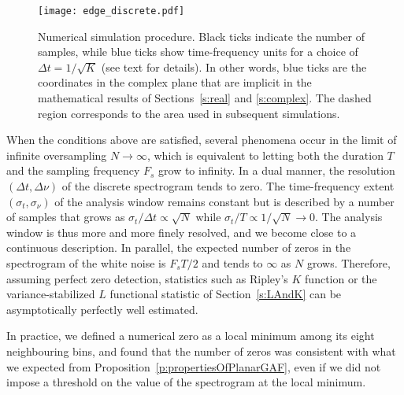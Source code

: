 \begin{figure}
	\centering 
	\texttt{[image: edge\_discrete.pdf]}
\caption{Numerical
    simulation procedure. Black ticks indicate the number of samples, while blue
    ticks show time-frequency units for a choice of $\Delta t = 1/\sqrt{K}$ (see
    text for details). In other words, blue ticks are the coordinates in the
    complex plane that are implicit in the mathematical results of
    Sections~\ref{s:real} and \ref{s:complex}. The dashed region corresponds to the area used in subsequent simulations.}\label{fig:edge_effects}
\end{figure}

When the conditions above are satisfied, several phenomena occur in the limit of
infinite oversampling $N\to\infty$, which is equivalent to letting both the
duration $T$ and the sampling
frequency $F_s$ grow to infinity. In a dual manner, the resolution $(\Delta t, \Delta \nu)$ of the
discrete spectrogram tends to zero. The time-frequency extent $(\sigma_t, \sigma_\nu)$ of
the analysis window remains constant but is described by a number of samples that grows as $\sigma_t/\Delta t \propto\sqrt{N}$ while $\sigma_t/T\propto 1/\sqrt{N}\to 0$. The analysis window is thus more and more finely resolved, and
we become close to a continuous description.
In parallel, the expected number of zeros in the spectrogram of the white noise is $F_sT/2$ and
tends to $\infty$ as $N$ grows. Therefore, assuming perfect zero detection, statistics such as Ripley's $K$ function
or the variance-stabilized $L$ functional statistic of Section~\ref{s:LAndK} can
be asymptotically perfectly well estimated. 

In practice, we defined a numerical
zero as a local minimum among its eight neighbouring bins, and found that the
number of zeros was consistent with what we expected from
Proposition~\ref{p:propertiesOfPlanarGAF}, even if we did not impose a threshold
on the value of the spectrogram at the local minimum. 

